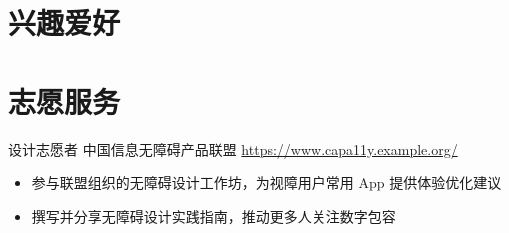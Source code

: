 \documentclass[a4paper, serif, 10pt]{moderncv}
\begin{document}
\section{兴趣爱好}

\section{志愿服务}

        {设计志愿者}
        {中国信息无障碍产品联盟}
        {\url{https://www.capa11y.example.org/}}
        {}
        {\begin{itemize}
\item 参与联盟组织的无障碍设计工作坊，为视障用户常用 App 提供体验优化建议
\item 撰写并分享无障碍设计实践指南，推动更多人关注数字包容
\end{itemize}}
    
\end{document}
